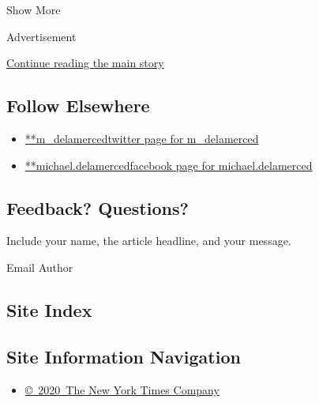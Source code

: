Show More

Advertisement

\protect\hyperlink{after-mid2}{Continue reading the main story}

\hypertarget{follow-elsewhere}{%
\subsection{Follow Elsewhere}\label{follow-elsewhere}}

\begin{itemize}
\tightlist
\item
  \href{https://twitter.com/m_delamerced}{**m\_delamercedtwitter page
  for m\_delamerced}
\item
  \href{https://www.facebookcorewwwi.onion/michael.delamerced}{**michael.delamercedfacebook
  page for michael.delamerced}
\end{itemize}

\hypertarget{feedback-questions}{%
\subsection{Feedback? Questions?}\label{feedback-questions}}

Include your name, the article headline, and your message.

Email Author

\hypertarget{site-index}{%
\subsection{Site Index}\label{site-index}}

\hypertarget{site-information-navigation}{%
\subsection{Site Information
Navigation}\label{site-information-navigation}}

\begin{itemize}
\tightlist
\item
  \href{https://help.nytimes3xbfgragh.onion/hc/en-us/articles/115014792127-Copyright-notice}{©~2020~The
  New York Times Company}
\end{itemize}

